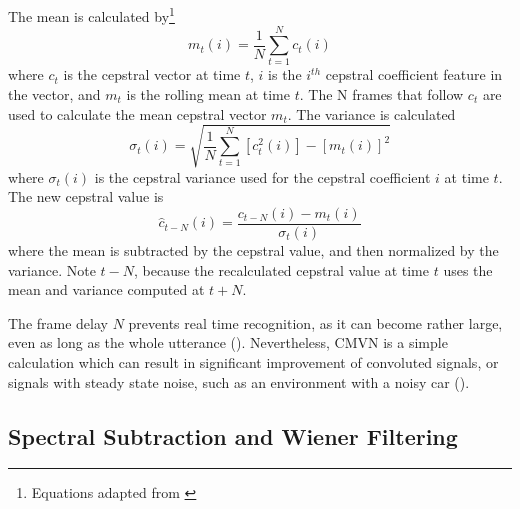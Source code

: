 The mean is calculated by\footnote{Equations adapted from \cite{viikki:98}} \begin{equation} m_t(i) = \dfrac{1}{N}\sum_{t=1}^{N} c_t(i) \end{equation} where $c_t$ is the cepstral vector at time $t$, $i$ is the $i^{th}$ cepstral coefficient feature in the vector, and $m_t$ is the rolling mean at time $t$.  The N frames that follow $c_t$ are used to calculate the mean cepstral vector $m_t$.  The variance is calculated \begin{equation} \sigma_t(i) = \sqrt{\dfrac{1}{N}\sum_{t=1}^{N} [c_t^2(i)] - [m_t(i)]^2} \end{equation} where $\sigma_t(i)$ is the cepstral variance used for the cepstral coefficient $i$ at time $t$.  The new cepstral value is \begin{equation} \hat{c}_{t-N}(i) =  \dfrac{c_{t-N}(i) - m_t(i)}{\sigma_{t}(i)} \end{equation} where the mean is subtracted by the cepstral value, and then normalized by the variance.  Note $t-N$, because the recalculated cepstral value at time $t$ uses the mean and variance computed at $t+N$.

The frame delay $N$ prevents real time recognition, as it can become rather large, even as long as the whole utterance (\cite{li:14}).  Nevertheless, CMVN is a simple calculation which can result in significant improvement of convoluted signals, or signals with steady state noise, such as an environment with a noisy car (\cite{viikki:98}).

\DIFdelbegin \subsubsection{}%
\addtocounter{subsubsection}{-1}%
\DIFdelend \DIFaddbegin \subsection{Spectral Subtraction and Wiener Filtering}\DIFaddend \label{sec:spec-sub_wiener}

